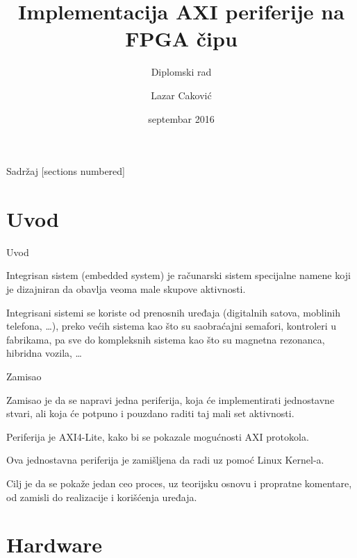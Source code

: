 \documentclass[10pt]{beamer}
\title{Implementacija AXI periferije na FPGA čipu}
\subtitle{Diplomski rad}
\date{septembar 2016}
\author{Lazar Caković}
\institute{Univerzitet u Beogradu, Elektrotehnički fakultet, Beograd}
\begin{document}
\maketitle

\begin{frame}{Sadržaj}
  [sections numbered]
  \tableofcontents[hideallsubsections]
\end{frame}

\section{Uvod}

\begin{frame}[fragile]{Uvod}

	Integrisan sistem (embedded system) je računarski sistem specijalne namene koji je dizajniran da obavlja veoma male skupove aktivnosti.

	\bigskip	
	
	Integrisani sistemi se koriste od prenosnih uređaja (digitalnih satova, moblinih telefona, \dots), preko većih sistema kao što su saobraćajni semafori, kontroleri u fabrikama, pa sve do kompleksnih sistema kao što su magnetna rezonanca, hibridna vozila, \dots
	
\end{frame}
\begin{frame}[fragile]{Zamisao}
  
	Zamisao je da se napravi jedna periferija, koja će implementirati jednostavne stvari, ali koja će potpuno i pouzdano raditi taj mali set aktivnosti.
	
	\bigskip
	
	Periferija je AXI4-Lite, kako bi se pokazale mogućnosti AXI protokola.
	
	\bigskip
	
	Ova jednostavna periferija je zamišljena da radi uz pomoć Linux Kernel-a.
	
	\bigskip	
	
	Cilj je da se pokaže jedan ceo proces, uz teorijsku osnovu i propratne komentare, od zamisli do realizacije i korišćenja uređaja.
  
\end{frame}

\section{Hardware}
\end{document}
